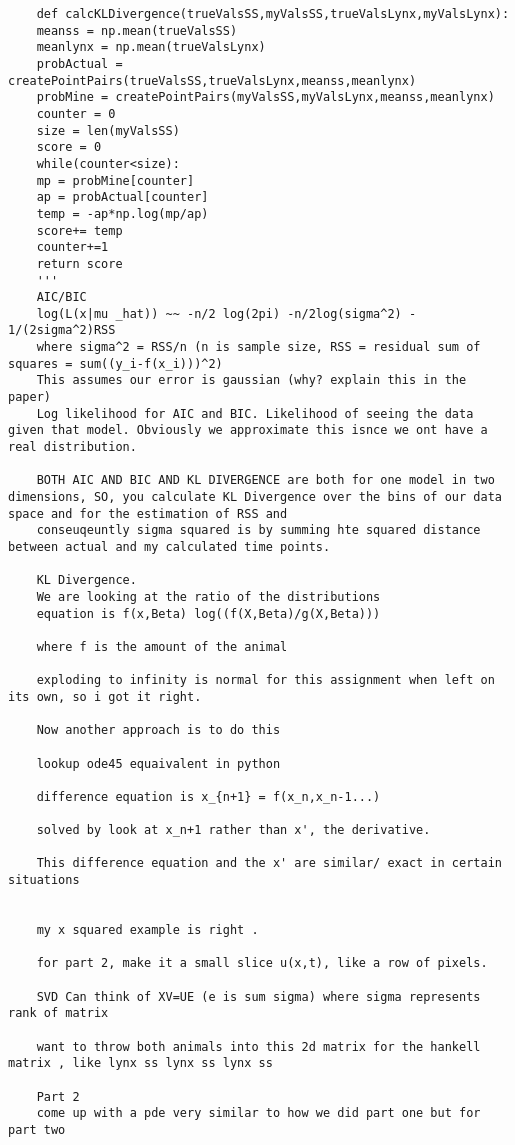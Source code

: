 \documentclass[12pt]{article}
\begin{document}
\begin{verbatim}
	def calcKLDivergence(trueValsSS,myValsSS,trueValsLynx,myValsLynx):
	meanss = np.mean(trueValsSS)
	meanlynx = np.mean(trueValsLynx)
	probActual = createPointPairs(trueValsSS,trueValsLynx,meanss,meanlynx)
	probMine = createPointPairs(myValsSS,myValsLynx,meanss,meanlynx)
	counter = 0
	size = len(myValsSS)
	score = 0
	while(counter<size):
	mp = probMine[counter]
	ap = probActual[counter]
	temp = -ap*np.log(mp/ap)
	score+= temp
	counter+=1
	return score
	'''
	AIC/BIC
	log(L(x|mu _hat)) ~~ -n/2 log(2pi) -n/2log(sigma^2) - 1/(2sigma^2)RSS
	where sigma^2 = RSS/n (n is sample size, RSS = residual sum of squares = sum((y_i-f(x_i)))^2)
	This assumes our error is gaussian (why? explain this in the paper)
	Log likelihood for AIC and BIC. Likelihood of seeing the data given that model. Obviously we approximate this isnce we ont have a real distribution.
	
	BOTH AIC AND BIC AND KL DIVERGENCE are both for one model in two dimensions, SO, you calculate KL Divergence over the bins of our data space and for the estimation of RSS and
	conseuqeuntly sigma squared is by summing hte squared distance between actual and my calculated time points.
	
	KL Divergence.
	We are looking at the ratio of the distributions
	equation is f(x,Beta) log((f(X,Beta)/g(X,Beta)))
	
	where f is the amount of the animal
	
	exploding to infinity is normal for this assignment when left on its own, so i got it right.
	
	Now another approach is to do this
	
	lookup ode45 equaivalent in python
	
	difference equation is x_{n+1} = f(x_n,x_n-1...)
	
	solved by look at x_n+1 rather than x', the derivative.
	
	This difference equation and the x' are similar/ exact in certain situations
	
	
	my x squared example is right .
	
	for part 2, make it a small slice u(x,t), like a row of pixels.
	
	SVD Can think of XV=UE (e is sum sigma) where sigma represents rank of matrix
	
	want to throw both animals into this 2d matrix for the hankell matrix , like lynx ss lynx ss lynx ss
	
	Part 2
	come up with a pde very similar to how we did part one but for part two
	

\end{verbatim}
\end{document}
